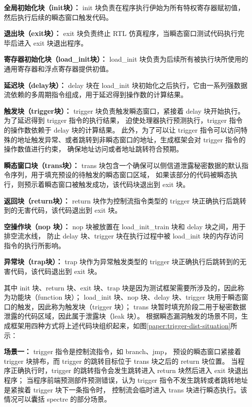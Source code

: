 \textbf{全局初始化块（init块）：}
init 块负责在程序执行伊始为所有特权寄存器赋初值，然后执行后续的瞬态窗口触发代码。\par
\textbf{退出块（exit块）：}
exit 块负责终止 RTL 仿真程序，当瞬态窗口测试代码执行完毕后进入 exit 块退出程序。\par
\textbf{寄存器初始化块（load\_init块）：}
load\_init 块负责为后续所有被执行块所使用的通用寄存器和浮点寄存器提供初值。\par
\textbf{延迟块（delay块）：}
delay 块在 load\_init 块初始化之后执行，它由一系列强数据流依赖的多周期指令组成，用于延迟得到操作数的计算结果。\par
\textbf{触发块（trigger块）：}
trigger 块负责触发瞬态窗口，紧接着 delay 块开始执行。为了延迟得到 trigger 指令的执行结果，
迫使处理器执行预测执行，trigger 指令的操作数依赖于 delay 块的计算结果。
此外，为了可以让 trigger 指令可以访问特殊的地址触发异常、或者跳转到非瞬态窗口的地址，生成框架会对 trigger 指令的操作数值进行约束，
确保地址访问或者地址跳转符合预期。\par
\textbf{瞬态窗口块（trans块）：}
trans 块包含一个确保可以侧信道泄露秘密数据的默认指令序列，用于填充预设的待触发的瞬态窗口区域，
如果该部分的代码被瞬态执行，则预示着瞬态窗口被触发成功，该代码块退出到 exit 块。\par
\textbf{返回块（return块）：}
return 块作为控制流指令类型的 trigger 块正确执行后跳转到的无害代码，该代码退出到 exit 块。\par
\textbf{空操作块（nop 块）：}
nop 块被放置在 load\_init\_train 块和 delay 块之间，用于排空流水线，
防止 delay 块、trigger 块在执行过程中被 load\_init 块的内存访问指令的执行所影响。\par
\textbf{异常块（trap块）：}
trap 块作为异常触发类型的 trigger 块正确执行后跳转到的无害代码，该代码退出到 exit 块。\par

其中 init 块、return 块、exit 块、trap 块是因为测试框架需要所涉及的，因此称为功能块（function 块）；
load\_init 块、nop 块、delay 块、trigger 块用于瞬态窗口的触发，因此称为触发块（trigger 块）；
trans 块暂时填充阶段二用于秘密数据泄露的代码区域，因此属于泄露块（leak 块）。
根据瞬态漏洞触发的场景不同，生成框架用四种方式将上述代码块组织起来，如图\ref{paper:trigger-dist-situation}所示：\par

\textbf{场景一：} trigger 指令是控制流指令，如 branch、jmp，
预设的瞬态窗口紧接着 trigger 块排布，而 trigger 的跳转目标位于 trans 块之后的 return 块位置。
当程序正确执行时，trigger 的跳转指令会发生跳转进入 return 块然后进入 exit 块退出程序；
当程序前端预测部件预测错误，认为 trigger 指令不发生跳转或者跳转地址是紧挨着 trigger 块下一条指令时，
控制流会临时进入 trans 块进行瞬态执行。该情况可以囊括 spectre 的部分场景。\par

